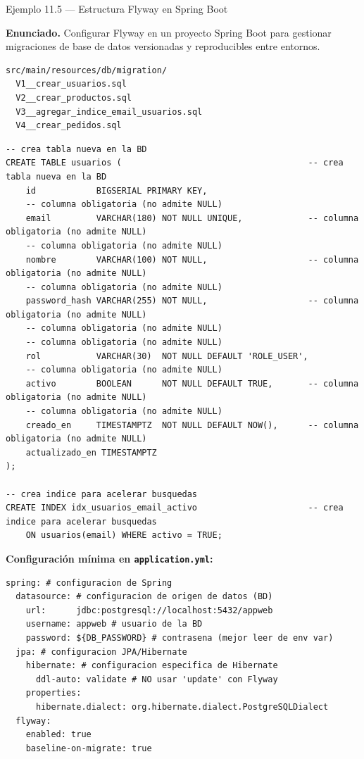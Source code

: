 \begin{cajaejemplo}{Ejemplo 11.5 --- Estructura Flyway en Spring Boot}

\textbf{Enunciado.} Configurar Flyway en un proyecto Spring Boot para gestionar migraciones de base de datos versionadas y reproducibles entre entornos.

\begin{lstlisting}[style=shell,numbers=none,caption={Ejemplo de Shell},label=lst:11.12]
src/main/resources/db/migration/
  V1__crear_usuarios.sql
  V2__crear_productos.sql
  V3__agregar_indice_email_usuarios.sql
  V4__crear_pedidos.sql
\end{lstlisting}

\begin{lstlisting}[style=sql,caption={V1\_\_crear\_usuarios.sql},label=lst:11.13]
-- crea tabla nueva en la BD
CREATE TABLE usuarios (                                     -- crea tabla nueva en la BD
    id            BIGSERIAL PRIMARY KEY,
    -- columna obligatoria (no admite NULL)
    email         VARCHAR(180) NOT NULL UNIQUE,             -- columna obligatoria (no admite NULL)
    -- columna obligatoria (no admite NULL)
    nombre        VARCHAR(100) NOT NULL,                    -- columna obligatoria (no admite NULL)
    -- columna obligatoria (no admite NULL)
    password_hash VARCHAR(255) NOT NULL,                    -- columna obligatoria (no admite NULL)
    -- columna obligatoria (no admite NULL)
    -- columna obligatoria (no admite NULL)
    rol           VARCHAR(30)  NOT NULL DEFAULT 'ROLE_USER',
    -- columna obligatoria (no admite NULL)
    activo        BOOLEAN      NOT NULL DEFAULT TRUE,       -- columna obligatoria (no admite NULL)
    -- columna obligatoria (no admite NULL)
    creado_en     TIMESTAMPTZ  NOT NULL DEFAULT NOW(),      -- columna obligatoria (no admite NULL)
    actualizado_en TIMESTAMPTZ
);

-- crea indice para acelerar busquedas
CREATE INDEX idx_usuarios_email_activo                      -- crea indice para acelerar busquedas
    ON usuarios(email) WHERE activo = TRUE;
\end{lstlisting}

\textbf{Configuración mínima en \texttt{application.yml}:}
\begin{lstlisting}[style=yaml,numbers=none,caption={Ejemplo de YAML},label=lst:11.14]
spring: # configuracion de Spring
  datasource: # configuracion de origen de datos (BD)
    url:      jdbc:postgresql://localhost:5432/appweb
    username: appweb # usuario de la BD
    password: ${DB_PASSWORD} # contrasena (mejor leer de env var)
  jpa: # configuracion JPA/Hibernate
    hibernate: # configuracion especifica de Hibernate
      ddl-auto: validate # NO usar 'update' con Flyway
    properties:
      hibernate.dialect: org.hibernate.dialect.PostgreSQLDialect
  flyway:
    enabled: true
    baseline-on-migrate: true
\end{lstlisting}
\end{cajaejemplo}


